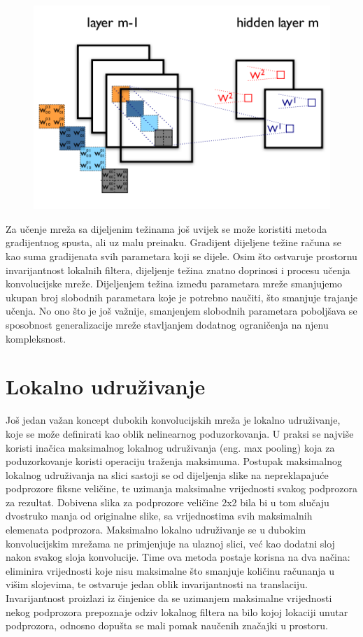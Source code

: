 \documentclass[lmodern, utf8, diplomski, numeric]{fer}
\begin{document}
\begin{figure}[ht!]
\centering
\includegraphics[width=12cm]{slike/shared_weights.png}
\caption{}
\end{figure}

Za učenje mreža sa dijeljenim težinama još uvijek se može koristiti metoda gradijentnog spusta, ali uz malu preinaku. Gradijent dijeljene težine računa se kao suma gradijenata svih parametara koji se dijele. 
Osim što ostvaruje prostornu invarijantnost lokalnih filtera, dijeljenje težina znatno doprinosi i procesu učenja konvolucijske mreže. Dijeljenjem težina između parametara  mreže smanjujemo ukupan broj slobodnih parametara koje je potrebno naučiti, što smanjuje trajanje učenja. No ono što je još važnije, smanjenjem slobodnih parametara poboljšava se sposobnost generalizacije mreže stavljanjem dodatnog ograničenja na njenu kompleksnost.  

\section{Lokalno udruživanje}

Još jedan važan koncept dubokih konvolucijskih mreža je lokalno udruživanje, koje se može definirati kao oblik nelinearnog poduzorkovanja. U praksi se najviše koristi inačica maksimalnog lokalnog udruživanja (eng. max pooling) koja za poduzorkovanje koristi operaciju traženja maksimuma. 
Postupak maksimalnog lokalnog udruživanja na slici sastoji se od dijeljenja slike na nepreklapajuće podprozore fiksne veličine, te uzimanja maksimalne vrijednosti svakog podprozora za rezultat. Dobivena slika za podprozore veličine 2x2 bila bi u tom slučaju dvostruko manja od originalne slike, sa vrijednostima svih maksimalnih elemenata podprozora. 
Maksimalno lokalno udruživanje se u dubokim konvolucijskim mrežama ne primjenjuje na ulaznoj slici, već kao dodatni sloj nakon svakog sloja konvolucije. Time ova metoda postaje korisna na dva načina: eliminira vrijednosti koje nisu maksimalne što smanjuje količinu računanja u višim slojevima, te ostvaruje jedan oblik invarijantnosti na translaciju. Invarijantnost proizlazi iz činjenice da se uzimanjem maksimalne vrijednosti nekog podprozora prepoznaje odziv lokalnog filtera na bilo kojoj lokaciji unutar podprozora, odnosno dopušta se mali pomak naučenih značajki u prostoru.
\end{document}
